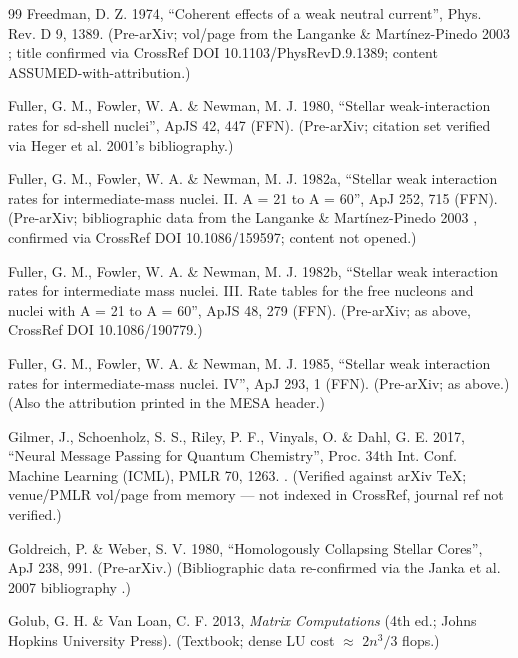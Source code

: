 \begin{thebibliography}{99}
Freedman, D. Z. 1974, ``Coherent effects of a weak neutral current'', Phys. Rev. D 9, 1389. (Pre-arXiv; vol/page from the Langanke \& Mart\'inez-Pinedo 2003 ; title confirmed via CrossRef DOI 10.1103/PhysRevD.9.1389; content ASSUMED-with-attribution.)

Fuller, G. M., Fowler, W. A. \& Newman, M. J. 1980, ``Stellar weak-interaction rates for sd-shell nuclei'', ApJS 42, 447 (FFN). (Pre-arXiv; citation set verified via Heger et al. 2001's bibliography.)

Fuller, G. M., Fowler, W. A. \& Newman, M. J. 1982a, ``Stellar weak interaction rates for intermediate-mass nuclei. II. A = 21 to A = 60'', ApJ 252, 715 (FFN). (Pre-arXiv; bibliographic data from the Langanke \& Mart\'inez-Pinedo 2003 , confirmed via CrossRef DOI 10.1086/159597; content not opened.)

Fuller, G. M., Fowler, W. A. \& Newman, M. J. 1982b, ``Stellar weak interaction rates for intermediate mass nuclei. III. Rate tables for the free nucleons and nuclei with A = 21 to A = 60'', ApJS 48, 279 (FFN). (Pre-arXiv; as above, CrossRef DOI 10.1086/190779.)

Fuller, G. M., Fowler, W. A. \& Newman, M. J. 1985, ``Stellar weak interaction rates for intermediate-mass nuclei. IV'', ApJ 293, 1 (FFN). (Pre-arXiv; as above.) (Also the attribution printed in the MESA  header.)

Gilmer, J., Schoenholz, S. S., Riley, P. F., Vinyals, O. \& Dahl, G. E. 2017, ``Neural Message Passing for Quantum Chemistry'', Proc. 34th Int. Conf. Machine Learning (ICML), PMLR 70, 1263. . (Verified against arXiv TeX; venue/PMLR vol/page from memory --- not indexed in CrossRef, journal ref not verified.)

Goldreich, P. \& Weber, S. V. 1980, ``Homologously Collapsing Stellar Cores'', ApJ 238, 991. (Pre-arXiv.) (Bibliographic data re-confirmed via the Janka et al. 2007 bibliography .)

Golub, G. H. \& Van Loan, C. F. 2013, \emph{Matrix Computations} (4th ed.; Johns Hopkins University Press). (Textbook; dense LU cost $\approx$ $2n^3/3$ flops.)


\end{thebibliography}

